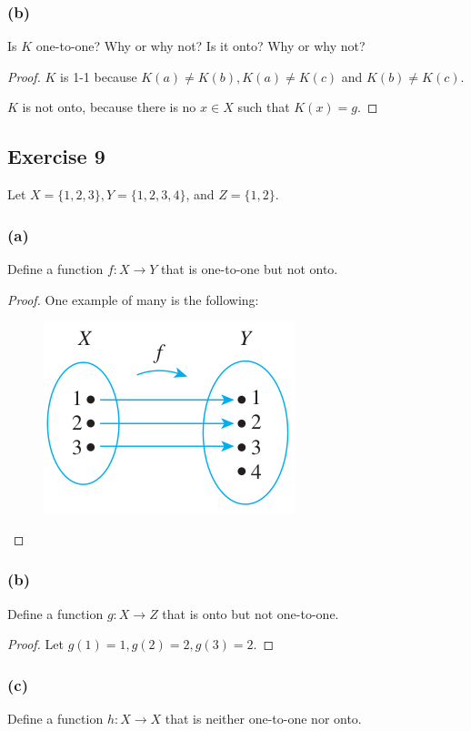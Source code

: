 \documentclass[14pt]{extarticle}
\begin{document}
\subsubsection{(b)}
Is $K$ one-to-one? Why or why not? Is it onto? Why or why not?

\begin{proof}
$K$ is 1-1 because \(K(a) \neq K(b), K(a) \neq K(c)\) and \(K(b) \neq K(c)\).

$K$ is not onto, because there is no $x \in X$ such that $K(x) = g$.
\end{proof}

\subsection{Exercise 9}
Let \(X = \{1, 2, 3\}, Y = \{1, 2, 3, 4\}\), and \(Z = \{1, 2\}\).

\subsubsection{(a)}
Define a function \(f: X \to Y\) that is one-to-one but not onto.

\begin{proof}
One example of many is the following:
\begin{figure}[ht!]
\centering
\includegraphics[scale=0.5]{../images/7.2.9.png}
\end{figure}
\end{proof}

\subsubsection{(b)}
Define a function \(g: X \to Z\) that is onto but not one-to-one.

\begin{proof}
Let \(g(1) = 1, g(2) = 2, g(3) = 2\).
\end{proof}

\subsubsection{(c)}
Define a function \(h: X \to X\) that is neither one-to-one nor onto.
\end{document}
